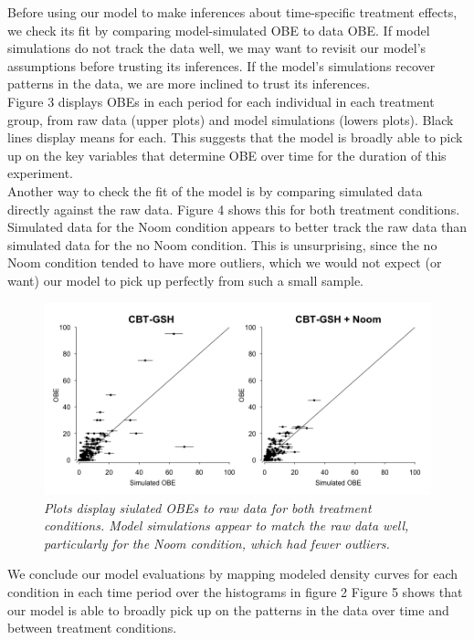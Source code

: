 \documentclass[12pt, oneside]{article}
\begin{document}
Before using our model to make inferences about time-specific treatment effects, we check its fit by comparing model-simulated OBE to data OBE.  If model simulations do not track the data well, we may want to revisit our model's assumptions before trusting its inferences.  If the model's simulations recover patterns in the data, we are more inclined to trust its inferences.  
\\

Figure 3 displays OBEs in each period for each individual in each treatment group, from raw data (upper plots) and model simulations (lowers plots).  Black lines display means for each.  This suggests that the model is broadly able to pick up on the key variables that determine OBE over time for the duration of this experiment.
\\

Another way to check the fit of the model is by comparing simulated data directly against the raw data.  Figure 4 shows this for both treatment conditions.  Simulated data for the Noom condition appears to better track the raw data than simulated data for the no Noom condition.  This is unsurprising, since the no Noom condition tended to have more outliers, which we would not expect (or want) our model to pick up perfectly from such a small sample.  
\\

\begin{figure}
\centering
\includegraphics[width=\textwidth, height=\textheight, keepaspectratio]{obe_ppcs.png}
\caption{\emph{Plots display siulated OBEs to raw data for both treatment conditions.  Model simulations appear to match the raw data well, particularly for the Noom condition, which had fewer outliers.}}
\end{figure}

We conclude our model evaluations by mapping modeled density curves for each condition in each time period over the histograms in figure 2  Figure 5 shows that our model is able to broadly pick up on the patterns in the data over time and between treatment conditions.
\end{document}
